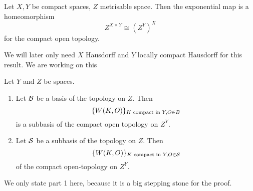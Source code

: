 \documentclass[language=english]{TemplateLecture}
\begin{document}
\begin{corollary}
    Let \(X,Y\) be compact spaces, \(Z\) metrisable space. Then the exponential map is a homeomorphism
    \[Z^{X \times Y} \cong (Z^Y)^X\]
    for the compact open topology.
\end{corollary}

We will later only need \(X\) Hausdorff and \(Y\) locally compact Hausdorff for this result. We are working on this

\begin{proposition}
    Let \(Y\) and \(Z\) be spaces.
    \begin{enumerate}
        \item Let \(\mathcal{B}\) be a basis of the topology on \(Z\). Then
        \[\{W(K,O)\}_{K \text{ compact in } Y, O \in B}\]
        is a subbasis of the compact open topology on \(Z^Y\).
        \item Let \(\mathcal{S}\) be a subbasis of the topology on \(Z\). Then
        \[\{W(K,O)\}_{K \text { compact in } Y, O \in \mathcal{S}}\]
        of the compact open-topology on \(Z^Y\).
    \end{enumerate}
\end{proposition}
We only state part 1 here, because it is a big stepping stone for the proof.
\end{document}
